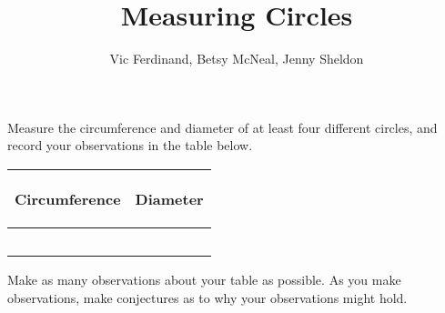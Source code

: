 \documentclass[nooutcomes]{ximera}
\title{Measuring Circles}
\author{Vic Ferdinand, Betsy McNeal, Jenny Sheldon}
\begin{document}
\begin{abstract}
\end{abstract}
\maketitle



\begin{problem} 
Measure the circumference and diameter of at least four different circles, and record your observations in the table below.
\vskip 0.1in
\begin{tabular}{|p{2.2in}|p{2.2in}|}
\hline
\begin{center} Circumference \end{center} & \begin{center} Diameter \end{center}  \\ \hline
 & \\ [5ex] \hline
 & \\ [5 ex] \hline
 & \\ [5 ex] \hline
 & \\ [5 ex] \hline
 & \\ [5 ex] \hline
\end{tabular}
\end{problem}

\begin{problem}
Make as many observations about your table as possible.  As you make observations, make conjectures as to why your observations might hold.

\end{problem}
\end{document}
